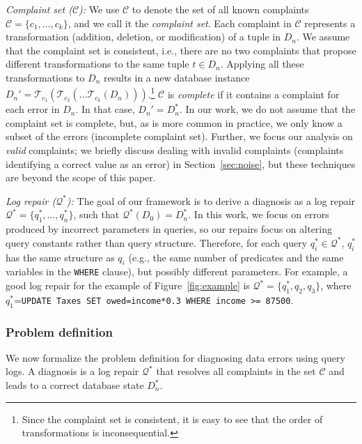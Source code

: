 \smallskip
\noindent
\emph{Complaint set ($\mathcal{C}$):}
We use $\mathcal{C}$ to denote the set of all known complaints
$\mathcal{C}=\{c_1,\dots,c_k\}$, and we call it the \emph{complaint set}.
Each complaint in $\mathcal{C}$ represents a transformation (addition,
deletion, or modification) of a tuple in $D_n$. We assume that the
complaint set is consistent, i.e., there are no two complaints that
propose different transformations to the same tuple $t\in D_n$.
Applying all these transformations to $D_n$ results in a new database
instance
$D_n'=\mathcal{T}_{c_1}(\mathcal{T}_{c_2}(\dots\mathcal{T}_{c_k}(D_n)))$.\footnote{Since
the complaint set is consistent, it is easy to see that the order of
transformations is inconsequential.} $\mathcal{C}$ is \emph{complete}
if it contains a complaint for each error in $D_n$. In that case,
$D_n'=D_n^*$. In our work, we do not assume that the complaint set is
complete, but, as is more common in practice, we only know a subset of
the errors (incomplete complaint set). Further, we focus our analysis
on \emph{valid} complaints; we briefly discuss dealing with invalid
complaints (complaints identifying a correct value as an error) in
Section~\ref{sec:noise}, but these techniques are beyond the scope of this paper.

\smallskip
\noindent
\emph{Log repair ($\mathcal{Q}^*$):}
The goal of our framework is to derive a diagnosis as a log repair
$\mathcal{Q}^*=\{q_1^*,\dots, q_n^*\}$, such that
$\mathcal{Q}^*(D_0)=D_n^*$. In this work, we focus on errors produced
by incorrect parameters in queries, so our repairs focus on altering
query constants rather than query structure. Therefore, for each query
$q_i^*\in\mathcal{Q}^*$, $q_i^*$ has the same structure as $q_i$
(e.g., the same number of predicates and the same variables in the \texttt{WHERE} clause), 
but possibly different parameters. For example, a good log repair for the
example of Figure~\ref{fig:example} is
$\mathcal{Q}^*=\{q_1^*,q_2,q_3\}$, where $q_1^*$=\texttt{UPDATE Taxes
SET owed=income*0.3 WHERE income >= 87500}.


\subsubsection*{Problem definition}

We now formalize the problem definition for diagnosing data
errors using query logs. A diagnosis is a log repair
$\mathcal{Q}^*$ that resolves all complaints in the set $\mathcal{C}$
and leads to a correct database state $D_n^*$.

